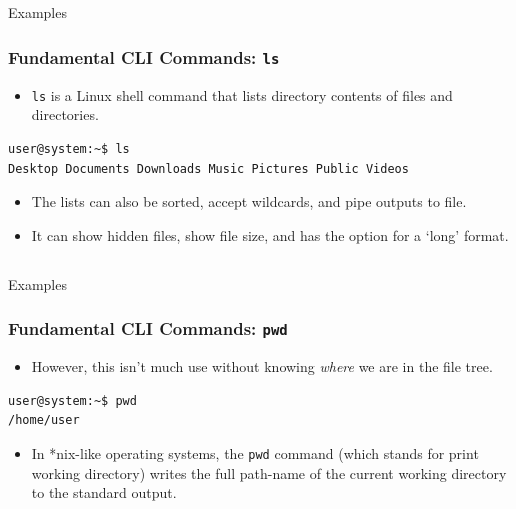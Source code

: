 \documentclass[10pt]{beamer}
\begin{document}
\subsection{}
\begin{frame}[fragile]{Examples}
\frametitle{Fundamental CLI Commands: \texttt{ls}}
\begin{itemize}
\item \texttt{ls} is a Linux shell command that lists directory contents of files and directories.\vspace{0.2in}
\end{itemize}
\begin{lstlisting}[style=BashInputStyle,title=The \texttt{ls} Command]
user@system:~$ ls
Desktop Documents Downloads Music Pictures Public Videos
\end{lstlisting}
\vspace{0.1in}
\begin{itemize}
\item The lists can also be sorted, accept wildcards, and pipe outputs to file. \vspace{0.1in}
\item It can show hidden files, show file size, and has the option for a `long' format.\vspace{0.1in}
\end{itemize}
\end{frame}

\subsection{}
\begin{frame}[fragile]{Examples}
\frametitle{Fundamental CLI Commands: \texttt{pwd}}
\begin{itemize}
\item However, this isn't much use without knowing \emph{where} we are in the file tree. \vspace{0.2in}
\end{itemize}
\begin{lstlisting}[style=BashInputStyle,title=The \texttt{pwd} Command]
user@system:~$ pwd
/home/user
\end{lstlisting}
\vspace{0.1in}
\begin{itemize}
\item In *nix-like operating systems, the \texttt{pwd} command (which stands for print working directory) writes the full path-name of the current working directory to the standard output.\\
\end{itemize}
\end{frame}
\end{document}
